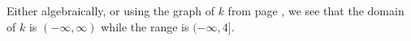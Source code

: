 \begin{example}

Either algebraically, or using the graph of $k$ from page \pageref{absvalgraph}, we see that the domain of $k$ is $(-\infty, \infty)$ while the range is $(-\infty, 4]$.

\end{example}

